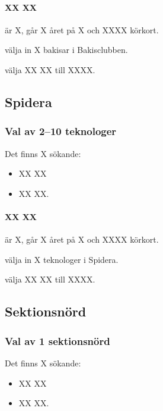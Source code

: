 \documentclass[hidelinks]{sektionsmote}
\begin{document}
\paragraph{XX XX} är X, går X året på X och XXXX körkort.

\begin{beslut}
  \item välja in X bakisar i Bakisclubben.
\end{beslut}
\begin{beslut}
  \item välja XX XX till XXXX.
\end{beslut}


\subsection{Spidera}
\subsubsection{Val av 2--10 teknologer}
Det finns X sökande:
\begin{itemize}
    \item XX XX
    \item XX XX.
\end{itemize}

\paragraph{XX XX} är X, går X året på X och XXXX körkort.

\begin{beslut}
  \item välja in X teknologer i Spidera.
\end{beslut}
\begin{beslut}
  \item välja XX XX till XXXX.
\end{beslut}


\subsection{Sektionsnörd}
\subsubsection{Val av 1 sektionsnörd}
Det finns X sökande:
\begin{itemize}
    \item XX XX
    \item XX XX.
\end{itemize}
\end{document}
